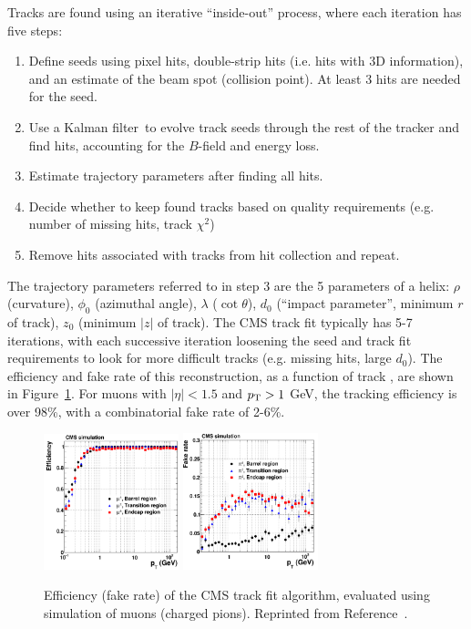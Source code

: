 Tracks are found using an iterative ``inside-out'' process, where each iteration has five steps:
\begin{enumerate}
    \item Define seeds using pixel hits, double-strip hits (i.e. hits with 3D information), and an estimate of the beam spot (collision point). At least 3 hits are needed for the seed.
    \item Use a Kalman filter~\needcite to evolve track seeds through the rest of the tracker and find hits, accounting for the $B$-field and energy loss.
    \item Estimate trajectory parameters after finding all hits.
    \item Decide whether to keep found tracks based on quality requirements (e.g. number of missing hits, track $\chi^2$)
    \item Remove hits associated with tracks from hit collection and repeat.
\end{enumerate}
The trajectory parameters referred to in step 3 are the 5 parameters of a helix: $\rho$ (curvature), $\phi_0$ (azimuthal angle), $\lambda$ ($\cot\theta$), $d_0$ (``impact parameter'', minimum $r$ of track), $z_0$ (minimum $|z|$ of track).
The CMS track fit typically has 5-7 iterations, with each successive iteration loosening the seed and track fit requirements to look for more difficult tracks (e.g. missing hits, large $d_0$).
The efficiency and fake rate of this reconstruction, as a function of track \pt, are shown in Figure~\ref{fig:cms:trackeff}.
For muons with $|\eta|<1.5$ and $p_\mathrm{T}>1$ GeV, the tracking efficiency is over 98\%, with a combinatorial fake rate of 2-6\%. 

\begin{figure}
    \begin{center} 
        \includegraphics[width=0.35\textwidth]{figures/cms/track_eff.png}
        \includegraphics[width=0.35\textwidth]{figures/cms/track_fake.png}
        \caption{Efficiency (fake rate) of the CMS track fit algorithm, evaluated using simulation of muons (charged pions).
                 Reprinted from Reference~\cite{cmstracker}.}
        \label{fig:cms:trackeff}
    \end{center}
\end{figure}

